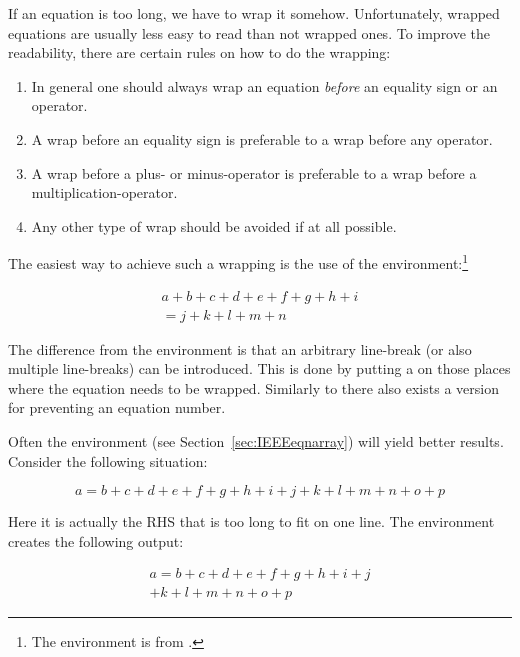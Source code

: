 If an equation is too long, we have to wrap it somehow. Unfortunately,
wrapped equations are usually less easy to read than not wrapped
ones. To improve the readability, there are certain rules on how to do
the wrapping:
\begin{enumerate}
  \item In general one should always wrap an equation \emph{before} an
        equality sign or an operator.
  \item A wrap before an equality sign is preferable to a wrap before
        any operator.
  \item A wrap before a plus- or minus-operator is preferable to a wrap
        before a multiplication-operator.
  \item Any other type of wrap should be avoided if at all possible.
\end{enumerate}
The easiest way to achieve such a wrapping is the use of the
 en\-vi\-ron\-ment:\footnote{The
   environment is from .}
\begin{example}
\begin{multline}
  a + b + c + d + e + f 
  + g + h + i  
  \\
  = j + k + l + m + n 
\end{multline}
\end{example}
\noindent
The difference from the  environment is that an arbitrary
line-break (or also multiple line-breaks) can be introduced. This is
done by putting a \ci{\bs} on those places where the equation needs
to be wrapped. Similarly to  there also exists a
 version for preventing an equation number.

Often the
 environment (see Section~\ref{sec:IEEEeqnarray})
will yield better results.  Consider the following
situation:
\begin{example}
\begin{equation}
  a = b + c + d + e + f 
  + g + h + i + j 
  + k + l + m + n + o + p  
  \label{eq:equation_too_long}
\end{equation}
\end{example}
\noindent
Here it is actually the RHS that is too long to fit on one line. The
 environment creates the following output:
\begin{example}
\begin{multline}
  a = b + c + d + e + f 
  + g + h + i + j \\
  + k + l + m + n + o + p
\end{multline}
\end{example}


